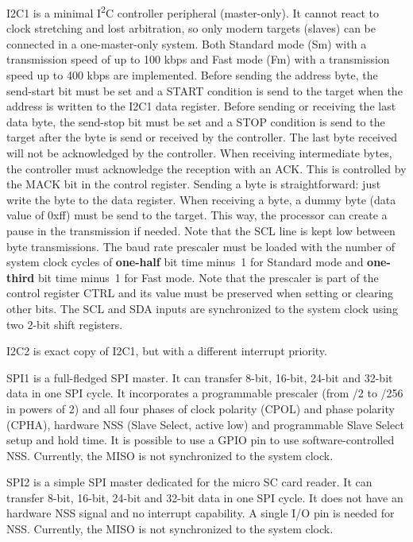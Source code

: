 \documentclass[12pt]{article}
\begin{document}
I2C1 is a minimal I\textsuperscript{2}C controller peripheral (master-only). It cannot react to clock stretching and lost arbitration, so only modern targets (slaves) can be connected in a one-master-only system. Both Standard mode (Sm) with a transmission speed of up to 100 kbps and Fast mode (Fm) with a transmission speed up to 400 kbps are implemented. Before sending the address byte, the send-start bit must be set and a START condition is send to the target when the address is written to the I2C1 data register. Before sending or receiving the last data byte, the send-stop bit must be set and a STOP condition is send to the target after the byte is send or received by the controller. The last byte received will not be acknowledged by the controller. When receiving intermediate bytes, the controller must acknowledge the reception with an ACK. This is controlled by the MACK bit in the control register. Sending a byte is straightforward: just write the byte to the data register. When receiving a byte, a dummy byte (data value of 0xff) must be send to the target. This way, the processor can create a pause in the transmission if needed. Note that the SCL line is kept low between byte transmissions. The baud rate prescaler must be loaded with the number of system clock cycles of \textbf{one-half} bit time minus~1 for Standard mode and \textbf{one-third} bit time minus~1 for Fast mode. Note that the prescaler is part of the control register CTRL and its value must be preserved when setting or clearing other bits. The SCL and SDA inputs are synchronized to the system clock using two 2-bit shift registers.

I2C2 is exact copy of I2C1, but with a different interrupt priority.

SPI1 is a full-fledged SPI master. It can transfer 8-bit, 16-bit, 24-bit and 32-bit data in one SPI cycle. It incorporates a programmable prescaler (from /2 to /256 in powers of 2) and all four phases of clock polarity (CPOL) and phase polarity (CPHA), hardware NSS (Slave Select, active low) and programmable Slave Select setup and hold time. It is possible to use a GPIO pin to use software-controlled NSS. Currently, the MISO is not synchronized to the system clock.

SPI2 is a simple SPI master dedicated for the micro SC card reader. It can transfer 8-bit, 16-bit, 24-bit and 32-bit data in one SPI cycle. It does not have an hardware NSS signal and no interrupt capability. A single I/O pin is needed for NSS. Currently, the MISO is not synchronized to the system clock.
\end{document}
